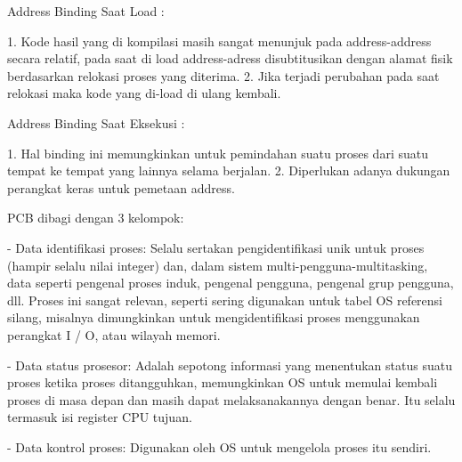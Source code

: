 Address Binding Saat Load :

1. Kode hasil yang di kompilasi masih sangat menunjuk pada address-address secara relatif, pada saat di load address-adress disubtitusikan dengan alamat fisik berdasarkan relokasi proses yang diterima.
2. Jika terjadi perubahan pada saat relokasi maka kode yang di-load di ulang kembali.

Address Binding Saat Eksekusi :

1. Hal binding ini memungkinkan untuk pemindahan suatu proses dari suatu tempat ke tempat yang lainnya selama berjalan.
2. Diperlukan adanya dukungan perangkat keras untuk pemetaan address.

PCB dibagi dengan 3 kelompok:

- Data identifikasi proses: Selalu sertakan pengidentifikasi unik untuk proses (hampir selalu nilai integer) dan, dalam sistem multi-pengguna-multitasking, data seperti pengenal proses induk, pengenal pengguna, pengenal grup pengguna, dll. Proses ini sangat relevan, seperti sering digunakan untuk tabel OS referensi silang, misalnya dimungkinkan untuk mengidentifikasi proses menggunakan perangkat I / O, atau wilayah memori.

- Data status prosesor: Adalah sepotong informasi yang menentukan status suatu proses ketika proses ditangguhkan, memungkinkan OS untuk memulai kembali proses di masa depan dan masih dapat melaksanakannya dengan benar. Itu selalu termasuk isi register CPU tujuan.

- Data kontrol proses: Digunakan oleh OS untuk mengelola proses itu sendiri.

